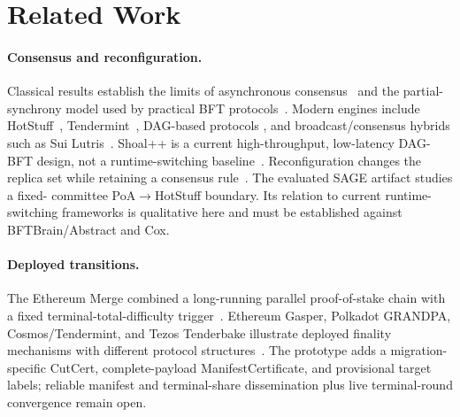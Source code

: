 \documentclass[journal]{IEEEtran}
\theoremstyle{definition}
\theoremstyle{remark}
\begin{document}
\section{Related Work}
\label{sec:related}

\paragraph{Consensus and reconfiguration.}
Classical results establish the limits of asynchronous consensus~\cite{flp} and the partial-
synchrony model used by practical BFT protocols~\cite{dls,pbft}. Modern engines include
HotStuff~\cite{hotstuff}, Tendermint~\cite{tendermint}, DAG-based protocols
\cite{narwhal,bullshark,shoal,shoalpp,autobahn,mysticeti}, and broadcast/consensus hybrids such as
Sui Lutris~\cite{suilutris}. Shoal++ is a current high-throughput, low-latency DAG-BFT design, not a
runtime-switching baseline~\cite{shoalpp}. Reconfiguration changes the replica set while retaining a
consensus rule~\cite{reconfig,bftsmart,mongoraft}. The evaluated SAGE artifact studies a fixed-
committee PoA$\rightarrow$HotStuff boundary. Its relation to current runtime-switching frameworks is
qualitative here and must be established against BFTBrain/Abstract and Cox.

\paragraph{Deployed transitions.}
The Ethereum Merge combined a long-running parallel proof-of-stake chain with a fixed
terminal-total-difficulty trigger~\cite{ethereummerge,eip3675}. Ethereum Gasper, Polkadot GRANDPA,
Cosmos/Tendermint, and Tezos Tenderbake illustrate deployed finality mechanisms with different
protocol structures~\cite{gasper,grandpa,tendermint,tenderbake}. The prototype adds a migration-
specific CutCert, complete-payload ManifestCertificate, and provisional target labels; reliable
manifest and terminal-share dissemination plus live terminal-round convergence remain open.
\end{document}
